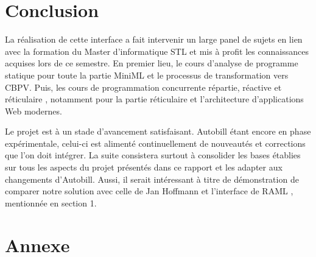 \documentclass[12pt]{article}
\begin{document}
\hypertarget{conclusion}{%
      \section{Conclusion}\label{conclusion}}

La réalisation de cette interface a fait intervenir un large panel de
sujets en lien avec la formation du Master d'informatique STL et mis à
profit les connaissances acquises lors de ce semestre. En premier lieu,
le cours d'analyse de programme statique
\cite{APS} pour toute la partie MiniML et le
processus de transformation vers CBPV. Puis, les cours de programmation
concurrente répartie, réactive et réticulaire
\cite{PC3R}, notamment pour la partie
réticulaire et l'architecture d'applications Web modernes.

Le projet est à un stade d'avancement satisfaisant. Autobill étant
encore en phase expérimentale, celui-ci est alimenté continuellement de
nouveautés et corrections que l'on doit intégrer. La suite consistera
surtout à consolider les bases établies sur tous les aspects du projet
présentés dans ce rapport et les adapter aux changements d'Autobill.
Aussi, il serait intéressant à titre de démonstration de comparer notre
solution avec celle de Jan Hoffmann et l'interface de RAML
\cite{RAML}, mentionnée en section 1.

\newpage

{}

\newpage

\section*{Annexe}\label{annexe}
%
\end{document}
